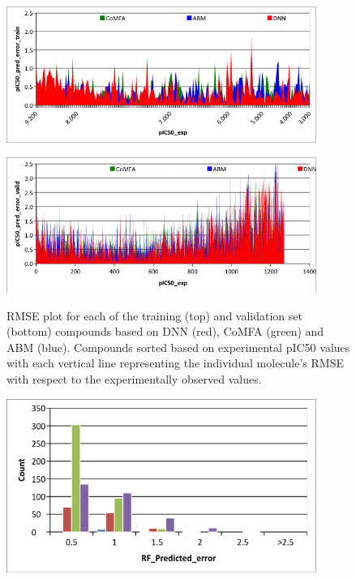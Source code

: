 \begin{figure}
  \centering
  \includegraphics[width=0.9\textwidth]{Images/fig_bace4A.png}
  \label{fig:bace_2A}
\end{figure}

\begin{figure}
  \centering
  \includegraphics[width=0.9\textwidth]{Images/fig_bace4B.png}
  \label{fig:bace_1D}
  \caption{RMSE plot for each of the training (top) and validation set (bottom) compounds based on DNN (red), CoMFA (green) and ABM (blue).  Compounds sorted based on experimental pIC50 values with each vertical line representing the individual molecule’s RMSE with respect to the experimentally observed values.}
\end{figure}


\begin{figure}
  \centering
  \includegraphics[width=0.9\textwidth]{Images/bace_fig5A.png}
  \label{fig:bace_5A}
\end{figure}

